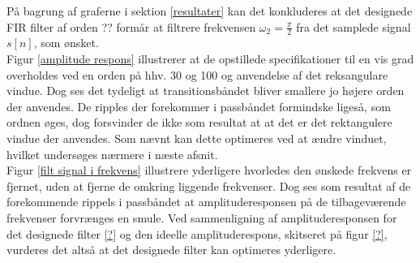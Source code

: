På bagrung af graferne i sektion \ref{resultater} kan det konkluderes at det designede FIR filter af orden ?? formår at filtrere frekvensen $\omega_2=\frac{\pi}{2}$ fra det samplede signal $s[n]$, som ønsket.\\
Figur \ref{amplitude respons} illustrerer at de opstillede specifikationer til en vis grad overholdes ved en orden på hhv. 30 og 100 og anvendelse af det reksangulare vindue. Dog ses det tydeligt at transitionsbåndet bliver smallere jo højere orden der anvendes. De ripples der forekommer i passbåndet formindske ligeså, som ordnen øges, dog forsvinder de ikke som resultat at at det er det rektangulere vindue der anvendes. Som nævnt kan dette optimeres ved at ændre vinduet, hvilket undersøges nærmere i næste afsnit. \\
Figur \ref{filt signal i frekvens} illustrere yderligere hvorledes den ønskede frekvens er fjernet, uden at fjerne de omkring liggende frekvenser. Dog ses som resultat af de forekommende  rippels i passbåndet at amplituderesponsen på de tilbageværende frekvenser forvrænges en smule.    
Ved sammenligning af amplituderesponsen for det designede filter \ref{?} og den ideelle amplituderespons, skitseret på figur \ref{?}, vurderes det altså at det designede filter kan optimeres yderligere. \\
          